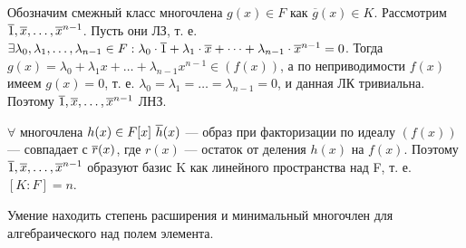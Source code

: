 \begin{solution}
Обозначим смежный класс многочлена \(g(x) \in F\) как \(\overline{g}(x) \in K\). Рассмотрим \(\overline{1}, \overline{x}, \dots, \overline{x}^{n-1}\). Пусть они ЛЗ, т. е. \(\exists \lambda_0, \lambda_1, \dots, \lambda_{n-1} \in F: \lambda_0\cdot\overline{1}+\lambda_1\cdot\overline{x}+\dots+\lambda_{n-1}\cdot\overline{x}^{n-1} = 0\). Тогда \(g(x) = \lambda_0+\lambda_1x+\dots+\lambda_{n-1}x^{n-1} \in (f(x))\), а по неприводимости \(f(x)\) имеем \(g(x) = 0\), т. е. \(\lambda_0 = \lambda_1 = \dots = \lambda_{n-1} = 0\), и данная ЛК тривиальна. Поэтому \(\overline{1}, \overline{x}, \dots, \overline{x}^{n-1}\) ЛНЗ.

\(\forall\) многочлена \(h(x) \in F[x] \ \overline{h}(x)\) --- образ при факторизации по идеалу \((f(x))\) --- совпадает с \(\overline{r}(x)\), где \(r(x)\) --- остаток от деления \(h(x)\) на \(f(x)\). Поэтому \(\overline{1}, \overline{x}, \dots, \overline{x}^{n-1}\) образуют базис K как линейного пространства над F, т. е. \([K:F] = n\).
\end{solution}

\begin{problem}[34 (7.9,7.10)] Умение находить степень расширения и минимальный многочлен для алгебраического над полем элемента.
\end{problem}

